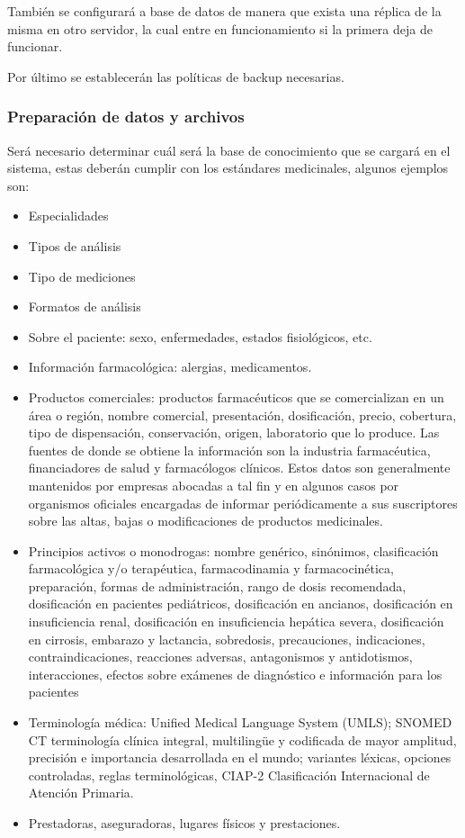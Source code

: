 \documentclass[a4paper,12pt]{article}
\begin{document}
	También se configurará a base de datos de manera que exista una réplica de la  misma en otro servidor, la cual entre en funcionamiento si la primera deja de funcionar.
	
	Por último se establecerán las políticas de backup necesarias.


	\subsubsection{Preparación de datos y archivos}
	Será necesario determinar cuál será la base de conocimiento que se cargará en el sistema, estas deberán cumplir con los estándares medicinales, algunos ejemplos son:
    \begin{itemize}
        \item Especialidades
        \item Tipos de  análisis
        \item Tipo de mediciones 
        \item Formatos de análisis
        \item Sobre el paciente: sexo, enfermedades, estados fisiológicos, etc.
        \item Información farmacológica: alergias, medicamentos.
        \item Productos comerciales: productos farmacéuticos que se comercializan en un área o región, nombre comercial, presentación, dosificación, precio, cobertura, tipo de dispensación, conservación, origen, laboratorio que lo produce. Las fuentes de donde se obtiene la información son la industria farmacéutica, financiadores de salud y farmacólogos clínicos. Estos datos son generalmente mantenidos por empresas abocadas a tal fin y en algunos casos por organismos oficiales encargadas de informar periódicamente a sus suscriptores sobre las altas, bajas o modificaciones de productos medicinales.
        \item Principios activos o monodrogas: nombre genérico, sinónimos, clasificación farmacológica y/o terapéutica, farmacodinamia y farmacocinética, preparación, formas de administración, rango de dosis recomendada, dosificación en pacientes pediátricos, dosificación en ancianos, dosificación en insuficiencia renal, dosificación en insuficiencia hepática severa, dosificación en cirrosis, embarazo y lactancia, sobredosis, precauciones, indicaciones, contraindicaciones, reacciones adversas, antagonismos y antidotismos, interacciones, efectos sobre exámenes de diagnóstico e información para los pacientes
        \item Terminología médica: Unified Medical Language System (UMLS); SNOMED CT  terminología clínica integral, multilingüe y codificada de mayor amplitud, precisión e importancia desarrollada en el mundo; variantes léxicas, opciones controladas, reglas terminológicas, CIAP-2 Clasificación Internacional de Atención Primaria.
        \item Prestadoras, aseguradoras, lugares físicos y prestaciones.
	\end{itemize} 
    
\end{document}

